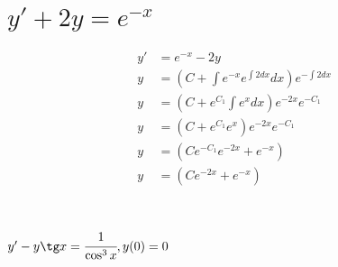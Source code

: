 



\section{$y' + 2y = e^{-x}$}

\begin{align*}
    y' & = e^{-x} - 2y                                                \\
    y  & = \left( C + \int e^{-x}e^{\int 2dx} dx \right)e^{-\int 2dx} \\
    y  & = \left( C + e^{C_1}\int e^{x} dx \right)e^{-2x}e^{-C_1}     \\
    y  & = \left( C +  e^{C_1}e^x \right)e^{-2x} e^{-C_1}             \\
    y  & = \left( Ce^{-C_1}e^{-2x} +  e^{-x} \right)                  \\
    y  & = \left( Ce^{-2x} +  e^{-x} \right)                          \\
\end{align*}

\section{$y'-y\tg x=\cfrac{1}{\cos^3x}, y(0)=0$}

